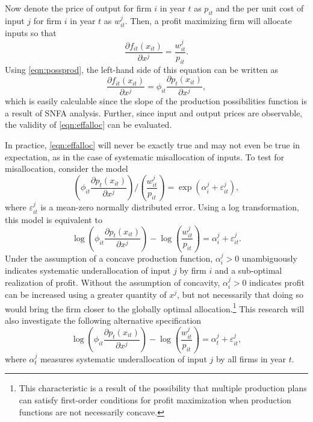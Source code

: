 \documentclass[twocolumn]{article}
\newcommand{\ep}{\varepsilon}
\begin{document}
Now denote the price of output for firm $i$ in year $t$ as $p_{it}$ and the per unit cost of input $j$ for firm $i$ in year $t$ as $w_{it}^j$. Then, a profit maximizing firm will allocate inputs so that
\begin{equation}
	\label{eqn:effalloc}
	\frac{\partial f_{it}(x_{it})}{\partial x^j} = \frac{w_{it}^j}{p_{it}}.
\end{equation}
Using \cref{eqn:possprod}, the left-hand side of this equation can be written as
\begin{equation}
	\frac{\partial f_{it}(x_{it})}{\partial x^j} = \phi_{it}\frac{\partial p_t(x_{it})}{\partial x^j},
\end{equation}
which is easily calculable since the slope of the production possibilities function is a result of SNFA analysis. Further, since input and output prices are observable, the validity of \cref{eqn:effalloc} can be evaluated.

In practice, \cref{eqn:effalloc} will never be exactly true and may not even be true in expectation, as in the case of systematic misallocation of inputs. To test for misallocation, consider the model
\begin{equation}
	\label{eqn:firmeffects}
	\left(\phi_{it}\frac{\partial p_t(x_{it})}{\partial x^j}\right) \bigg/ \left(\frac{w_{it}^j}{p_{it}}\right) = \exp(\alpha_i^j + \ep_{it}^j),
\end{equation}
where $\ep_{it}^j$ is a mean-zero normally distributed error. Using a log transformation, this model is equivalent to
\begin{equation}
	\log\left(\phi_{it}\frac{\partial p_t(x_{it})}{\partial x^j}\right) - \log\left(\frac{w_{it}^j}{p_{it}}\right) = \alpha_i^j + \ep_{it}^j.
\end{equation}
Under the assumption of a concave production function, $\alpha_i^j>0$ unambiguously indicates systematic underallocation of input $j$ by firm $i$ and a sub-optimal realization of profit. Without the assumption of concavity, $\alpha_i^j>0$ indicates profit can be increased using a greater quantity of $x^j$, but not necessarily that doing so would bring the firm closer to the globally optimal allocation.\footnote{This characteristic is a result of the possibility that multiple production plans can satisfy first-order conditions for profit maximization when production functions are not necessarily concave.} This research will also investigate the following alternative specification
\begin{equation}
	\label{eqn:timeeffects}
	\log\left(\phi_{it}\frac{\partial p_t(x_{it})}{\partial x^j}\right) - \log\left(\frac{w_{it}^j}{p_{it}}\right) = \alpha_t^j + \ep_{it}^j,
\end{equation}
where $\alpha_t^j$ measures systematic underallocation of input $j$ by all firms in year $t$.
\end{document}
